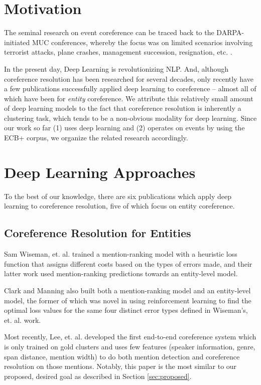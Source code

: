 \section{Motivation}
The seminal research on event coreference can be traced back to the DARPA-initiated MUC conferences, whereby the focus was on limited scenarios involving terrorist attacks, plane crashes, management succession, resignation, etc. \cite{Humphreys:1997:ECI:1598819.1598830,Bagga:1999:CEC:1608810.1608812}.

In the present day, Deep Learning is revolutionizing NLP.  And, although coreference resolution has been researched for several decades, only recently have a few publications successfully applied deep learning to coreference -- almost all of which have been for \textit{entity} coreference.  We attribute this relatively small amount of deep learning models to the fact that coreference resolution is inherently a clustering task, which tends to be a non-obvious modality for deep learning.  Since our work so far (1) uses deep learning and (2) operates on events by using the ECB+ corpus, we organize the related research accordingly.

\section{Deep Learning Approaches}
To the best of our knowledge, there are six publications which apply deep learning to coreference resolution, five of which focus on entity coreference.

\subsection{Coreference Resolution for Entities}
Sam Wiseman, et. al. \cite{DBLP:conf/acl/WisemanRSW15,DBLP:conf/naacl/WisemanRS16} trained a mention-ranking model with a heuristic loss function that assigns different costs based on the types of errors made, and their latter work used mention-ranking predictions towards an entity-level model.

Clark and Manning \cite{clark2016improving,DBLP:journals/corr/ClarkM16a} also built both a mention-ranking model and an entity-level model, the former of which was novel in using reinforcement learning to find the optimal loss values for the same four distinct error types defined in Wiseman's, et. al. \cite{DBLP:conf/acl/WisemanRSW15} work.

Most recently, Lee, et. al. \cite{D17-1018} developed the first end-to-end coreference system which is only trained on gold clusters and uses few features (speaker information, genre, span distance, mention width) to do both mention detection and coreference resolution on those mentions.  Notably, this paper is the most similar to our proposed, desired goal as described in Section \ref{sec:proposed}.

